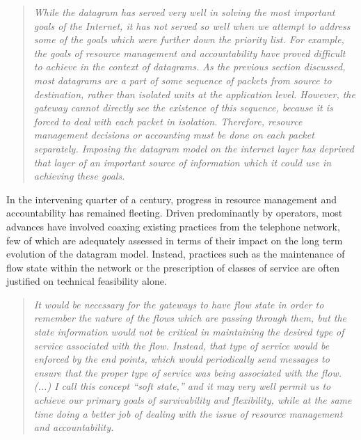 \begin{quote}
\textit{While the datagram has served very well in solving the most important goals of the Internet, it has not served so well when we attempt to address some of the goals which were further down the priority list. 
For example, the goals of resource management and accountability have proved difficult to achieve in the context of datagrams.
As the previous section discussed, most datagrams are a part of some sequence of packets from source to destination, rather than isolated units at the application level.  
However, the gateway cannot directly see the existence of this sequence, because it is forced to deal with each packet in isolation.  
Therefore, resource management decisions or accounting must be done on each packet separately.  
Imposing the datagram model on the internet layer has deprived that layer of an important source of information which it could use in achieving these goals.}
\end{quote}

In the intervening quarter of a century, progress in resource management and accountability has remained fleeting.
Driven predominantly by operators, most advances have involved coaxing existing practices from the telephone network, few of which are adequately assessed in terms of their impact on the long term evolution of the datagram model.
Instead, practices such as the maintenance of flow state within the network or the prescription of classes of service are often justified on technical feasibility alone.
\LOREM
\LOREM

\begin{quote}
\textit{
It would be necessary for the gateways to have flow state in order to remember the nature of the flows which are passing through them, but the state information would not be critical in maintaining the desired type of service associated with the flow. Instead, that type of service would be enforced by the end points, which would periodically send messages to ensure that the proper type of service was being associated with the flow.
(...)
I call this concept ``soft state,'' and it may very well permit us to achieve our primary goals of survivability and flexibility, while at the same time doing a better job of dealing with the issue of resource management and accountability.
}
\end{quote}

